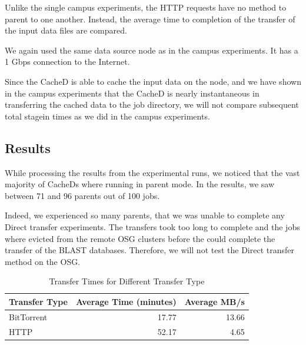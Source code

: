 


Unlike the single campus experiments, the HTTP requests have no method to parent to one another. Instead, the average time to completion of the transfer of the input data files are compared.

We again used the same data source node as in the campus experiments.  It has a 1 Gbps connection to the Internet.

Since the CacheD is able to cache the input data on the node, and we have shown in the campus experiments that the CacheD is nearly instantaneous in transferring the cached data to the job directory, we will not compare subsequent total stagein times as we did in the campus experiments.

\subsection{Results}

While processing the results from the experimental runs, we noticed that the vast majority of CacheDs where running in parent mode.  In the results, we saw between 71 and 96 parents out of 100 jobs.

Indeed, we experienced so many parents, that we was unable to complete any Direct transfer experiments.  The transfers took too long to complete and the jobs where evicted from the remote OSG clusters before the could complete the transfer of the BLAST databases.  Therefore, we will not test the Direct transfer method on the OSG.

\begin{table}[h!t]
	\centering
	\bgroup
	\def\arraystretch{1.5}
\begin{tabular}{|l|r|r|}
\hline
\textbf{Transfer Type} & \textbf{Average Time (minutes)} & \textbf{Average MB/s} \\ \hline
BitTorrent & 17.77 & 13.66 \\ \hline
HTTP & 52.17 & 4.65 \\ \hline
\end{tabular}
\egroup
\caption{Transfer Times for Different Transfer Type}
\label{tbl:osgtransferstats}
\end{table}

